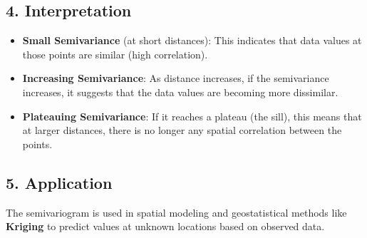 \documentclass{article}
\begin{document}
	\subsection*{4. Interpretation}
	\begin{itemize}
		\item \textbf{Small Semivariance} (at short distances): This indicates that data values at those points are similar (high correlation).
		\item \textbf{Increasing Semivariance}: As distance increases, if the semivariance increases, it suggests that the data values are becoming more dissimilar.
		\item \textbf{Plateauing Semivariance}: If it reaches a plateau (the sill), this means that at larger distances, there is no longer any spatial correlation between the points.
	\end{itemize}
	
	\subsection*{5. Application}
	The semivariogram is used in spatial modeling and geostatistical methods like \textbf{Kriging} to predict values at unknown locations based on observed data.
	
\end{document}
